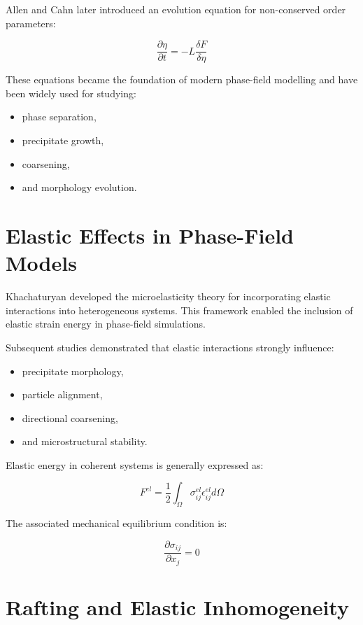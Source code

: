 Allen and Cahn later introduced an evolution equation for non-conserved order parameters:

\begin{equation}
\frac{\partial \eta}{\partial t}=-L\frac{\delta F}{\delta \eta}
\end{equation}

These equations became the foundation of modern phase-field modelling and have been widely used for studying:

\begin{itemize}
	\item phase separation,
	\item precipitate growth,
	\item coarsening,
	\item and morphology evolution.
\end{itemize}

\section{Elastic Effects in Phase-Field Models}

Khachaturyan developed the microelasticity theory for incorporating elastic interactions into heterogeneous systems. This framework enabled the inclusion of elastic strain energy in phase-field simulations.

Subsequent studies demonstrated that elastic interactions strongly influence:

\begin{itemize}
	\item precipitate morphology,
	\item particle alignment,
	\item directional coarsening,
	\item and microstructural stability.
\end{itemize}

Elastic energy in coherent systems is generally expressed as:

\begin{equation}
F^{el}=\frac{1}{2}\int_{\Omega}\sigma_{ij}^{el}\epsilon_{ij}^{el}d\Omega
\end{equation}

The associated mechanical equilibrium condition is:

\begin{equation}
\frac{\partial \sigma_{ij}}{\partial x_j}=0
\end{equation}

\section{Rafting and Elastic Inhomogeneity}

